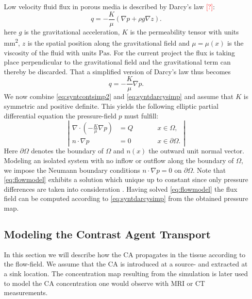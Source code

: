 \documentclass[paper=a4, fontsize=12pt,parskip=half, draft, headings=small]{scrartcl}
\newcommand{\missingsource}{\textcolor{red}{[?]}}
\begin{document}
	Low velocity fluid flux in porous media is described by Darcy's law \missingsource:
	\[
		q = -\frac{K}{\mu} \left( \nabla p + \rho g  \nabla z \right).
	\]
	here $g$ is the gravitational acceleration, $K$ is the permeability tensor with units \si{\square\milli\meter}, $z$ is the spatial position along the gravitational field and $\mu = \mu(x)$ is the viscosity of the fluid with units $\si{\pascal\second}$.
	For the current project the flux is taking place perpendicular to the gravitational field and the gravitational term can thereby be discarded.
	That a simplified version of Darcy's law thus becomes
	\begin{equation}
		q = -\frac{K}{\mu} \nabla p.
		\label{eq:syntdarcysimp}
	\end{equation}
	We now combine \eqref{eq:syntcontsimp2} and \eqref{eq:syntdarcysimp} and assume that $K$ is symmetric and positive definite.
	This yields the following elliptic partial differential equation the pressure-field $p$ must fulfill:
	\begin{equation}
		\left\vert
		\begin{alignedat}{2}
			\nabla \cdot \left( -\frac{K}{\mu} \nabla p \right) &= Q  \qquad &&x \in \Omega, \\
			n \cdot \nabla p &=0 &&x \in \partial \Omega.
		\end{alignedat}
		\right\vert
		\label{eq:flowmodel}
	\end{equation}
	Here $\partial \Omega$ denotes the boundary of $\Omega$ and $n(x)$ the outward unit normal vector. 
	Modeling an isolated system with no inflow or outflow along the boundary of $\Omega$, we impose the Neumann boundary conditions $n \cdot \nabla p = 0$ on $\partial \Omega$.
	Note that \eqref{eq:flowmodel} exhibits a solution which unique up to constant since only pressure differences are taken into consideration \cite{evans98}.
	Having solved \eqref{eq:flowmodel} the flux field can be computed according to \eqref{eq:syntdarcysimp} from the obtained pressure map. 
	
	
	\subsection{Modeling the Contrast Agent Transport}\label{sec:transport}
	In this section we will describe how the CA propagates in the tissue according to the flow-field.
	We assume that the CA is introduced at a source- and extracted at a sink location.
	The concentration map resulting from the simulation is later used to model the CA concentration one would observe with MRI or CT measurements.
	
\end{document}
